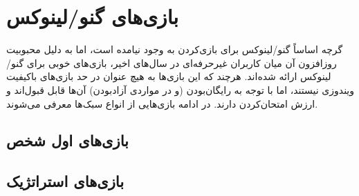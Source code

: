 \chapter{بازی‌های گنو/لینوکس}
گرچه اساساً گنو/لینوکس برای بازی‌کردن به وجود نیامده است، اما به دلیل محبوبیت روزافزون آن میان کاربران غیرحرفه‌ای در سال‌های اخیر، بازی‌های خوبی برای گنو/لینوکس ارائه شده‌اند. هرچند که این بازی‌ها به هیچ عنوان در حد بازی‌های باکیفیت ویندوزی نیستند، اما با توجه به رایگان‌بودن (و در مواردی آزادبودن) آن‌ها قابل قبول‌اند و ارزش امتحان‌کردن دارند. در ادامه بازی‌هایی از انواع سبک‌ها معرفی می‌شوند.

\section{بازی‌های اول شخص}
\subsection[Nexuiz]{}

\subsection[Tremulous]{}
\subsection[Terror Urban]{}
\subsection[Warsow]{}
\subsection[OpenArena]{}

\section{بازی‌های استراتژیک}
\subsection[Freeciv]{}
\subsection[2100 Warzone]{}
\subsection[OpenTTD]{}
